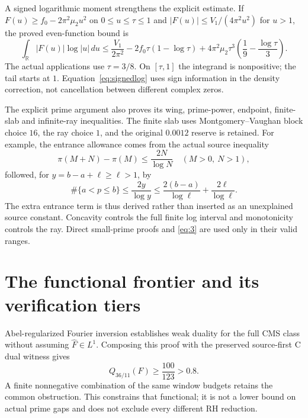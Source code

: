 \documentclass[11pt]{article}
\newcommand{\RR}{\mathbb R}
\begin{document}
A signed logarithmic moment strengthens the explicit estimate. If
\(F(u)\ge f_0-2\pi^2\mu_2u^2\) on \(0\le u\le\tau\le1\) and
\(|F(u)|\le V_1/(4\pi^2u^2)\) for \(u>1\), the proved even-function bound is
\[
 \int_{\RR}|F(u)|\log|u|\,du
 \le \frac{V_1}{2\pi^2}
 -2f_0\tau(1-\log\tau)
 +4\pi^2\mu_2\tau^3\left(\frac19-\frac{\log\tau}{3}\right).
 \tag{8}\label{eq:signedlog}
\]
The actual applications use \(\tau=3/8\). On \([\tau,1]\) the integrand is
nonpositive; the tail starts at \(1\). Equation~\eqref{eq:signedlog}
uses sign information in the density correction, not cancellation between
different complex zeros.

The explicit prime argument also proves its wing, prime-power, endpoint,
finite-slab and infinite-ray inequalities. The finite slab uses
Montgomery--Vaughan block choice \(16\), the ray choice \(1\), and the
original \(0.0012\) reserve is retained. For example, the entrance allowance
comes from the actual source inequality
\[
 \pi(M+N)-\pi(M)\le\frac{2N}{\log N}
 \quad(M>0,\ N>1),
 \tag{9}
\]
followed, for \(y=b-a+\ell\ge\ell>1\), by
\[
 \#\{a<p\le b\}\le\frac{2y}{\log y}
 \le\frac{2(b-a)}{\log\ell}+\frac{2\ell}{\log\ell}.
\]
The extra entrance term is thus derived rather than inserted as an unexplained
source constant. Concavity controls the full finite log interval and
monotonicity controls the ray. Direct small-prime proofs and \eqref{eq:3}
are used only in their valid ranges.

\section{The functional frontier and its verification tiers}
Abel-regularized Fourier inversion establishes weak duality for the full CMS
class without assuming \(\widehat F\in L^1\). Composing this proof with the
preserved source-first C dual witness gives
\[
 Q_{36/11}(F)\ge\frac{100}{123}>0.8.
 \tag{10}\label{eq:10}
\]
A finite nonnegative combination of the same window budgets retains the
common obstruction. This constrains that functional; it is not a lower bound
on actual prime gaps and does not exclude every different RH reduction.
\end{document}
